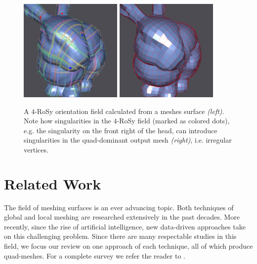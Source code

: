 \documentclass{ACGSeminar}
\begin{document}
\begin{figure}[htb!]
	\begin{centering}
		\includegraphics[width=5cm]{img/n-Rosy-orientation.png} \includegraphics[width=5cm]{img/n-Rosy-Mesh.png}\par
	\end{centering}
	\caption{A $4$-RoSy orientation field calculated from a meshes surface \textit{(left)}. Note how singularities in the $4$-RoSy field (marked as colored dots), e.g. the singularity on the front right of the head, can introduce singularities in the quad-dominant output mesh \textit{(right)}, i.e. irregular vertices.}
	\label{fig:n-rosy-geometry}
\end{figure}



\section{Related Work}\label{related_work}
The field of meshing surfaces is an ever advancing topic. Both techniques of global and local meshing are researched extensively in the past decades. More recently, since the rise of artificial intelligence, new data-driven approaches take on this challenging problem. Since there are many respectable studies in this field, we focus our review on one approach of each technique, all of which produce quad-meshes. For a complete survey we refer the reader to \cite{bommes2013quad}.
\end{document}
